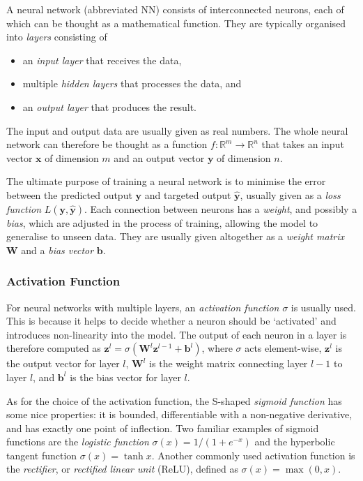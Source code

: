 \documentclass[a4paper,11pt, titlepage]{article}
\theoremstyle{definition}
\theoremstyle{plain}
\theoremstyle{remark}
\begin{document}
A neural network (abbreviated NN) consists of interconnected neurons, each of which can be thought as a mathematical function. They are typically organised into \textit{layers} consisting of

\begin{itemize}
    \item an \textit{input layer} that receives the data,
    \item multiple \textit{hidden layers} that processes the data, and
    \item an \textit{output layer} that produces the result.
\end{itemize}

The input and output data are usually given as real numbers. The whole neural network can therefore be thought as a function $f:\mathbb{R}^m\rightarrow\mathbb{R}^n$ that takes an input vector $\mathbf{x}$ of dimension $m$ and an output vector $\mathbf{y}$ of dimension $n$.

The ultimate purpose of training a neural network is to minimise the error between the predicted output $\mathbf{y}$ and targeted output $\mathbf{\hat{y}}$, usually given as a \textit{loss function} $L(\mathbf{y}, \mathbf{\hat{y}})$. Each connection between neurons has a \textit{weight}, and possibly a \textit{bias}, which are adjusted in the process of training, allowing the model to generalise to unseen data. They are usually given altogether as a \textit{weight matrix} $\mathbf{W}$ and a \textit{bias vector} $\mathbf{b}$.

\subsubsection{Activation Function}

For neural networks with multiple layers, an \textit{activation function} $\sigma$ is usually used. This is because it helps to decide whether a neuron should be ‘activated’ and introduces non-linearity into the model. The output of each neuron in a layer is therefore computed as $\mathbf{z}^l=\sigma\left(\mathbf{W}^l\mathbf{z}^{l-1}+\mathbf{b}^l\right)$, where $\sigma$ acts element-wise, $\mathbf{z}^l$ is the output vector for layer $l$, $\mathbf{W}^l$ is the weight matrix connecting layer $l-1$ to layer $l$, and $\mathbf{b}^l$ is the bias vector for layer $l$. 

As for the choice of the activation function, the S-shaped \textit{sigmoid function} has some nice properties: it is bounded, differentiable with a non-negative derivative, and has exactly one point of inflection. Two familiar examples of sigmoid functions are the \textit{logistic function} $\sigma(x)=1/\left(1+e^{-x}\right)$ and the hyperbolic tangent function $\sigma(x)=\tanh x$. Another commonly used activation function is the \textit{rectifier}, or \textit{rectified linear unit} (ReLU), defined as $\sigma(x)=\max(0, x)$.
\end{document}
